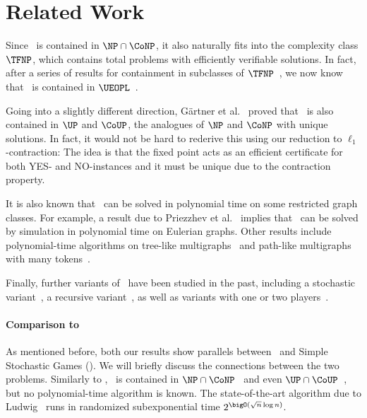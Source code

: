 \section{Related Work}
Since \arrival\ is contained in $\NP \cap \CoNP$, it also naturally fits into the complexity class $\TFNP$, which contains total problems with efficiently verifiable solutions. In fact, after a series of results for containment in subclasses of $\TFNP$~\cite{karthikc.s.DidTrainReach2017, gartnerARRIVALNextStop2018}, we now know that \arrival\ is contained in $\UEOPL$~\cite{fearnleyUniqueEndPotential2020}.

Going into a slightly different direction, Gärtner et al.\@~\cite{gartnerARRIVALNextStop2018} proved that \arrival\ is also contained in $\UP$ and $\CoUP$, the analogues of $\NP$ and $\CoNP$ with unique solutions. 
In fact, it would not be hard to rederive this using our reduction to $\ell_1$-contraction: The idea is that the fixed point acts as an efficient certificate for both YES- and NO-instances and it must be unique due to the contraction property.

It is also known that \arrival\ can be solved in polynomial time on some restricted graph classes. For example, a result due to Priezzhev et al.\@~\cite{priezzhevEulerianWalkersModel1996} implies that \arrival\ can be solved by simulation in polynomial time on Eulerian graphs. Other results include polynomial-time algorithms on tree-like multigraphs~\cite{augerPolynomialTimeAlgorithm2022} and path-like multigraphs with many tokens~\cite{augerGeneralizedARRIVALProblem2023}. 

Finally, further variants of \arrival\ have been studied in the past, including a stochastic variant~\cite{websterStochasticArrivalProblem2022}, a recursive variant~\cite{websterRecursiveArrivalProblem2023}, as well as variants with one or two players~\cite{fearnleyReachabilitySwitchingGames2021}.

\paragraph*{Comparison to \ssg\ }

As mentioned before, both our results show parallels between \arrival\ and Simple Stochastic Games (\ssg). We will briefly discuss the connections between the two problems. 
Similarly to \arrival, \ssg\ is contained in $\NP \cap \CoNP$~\cite{condonComplexityStochasticGames1992} and even $\UP \cap \CoUP$~\cite{chatterjeeReductionParityGames2011a}, but no polynomial-time algorithm is known. The state-of-the-art algorithm due to Ludwig~\cite{ludwigSubexponentialRandomizedAlgorithm1995} runs in randomized subexponential time $2^{\bigO(\sqrt{n}\log n)}$.

